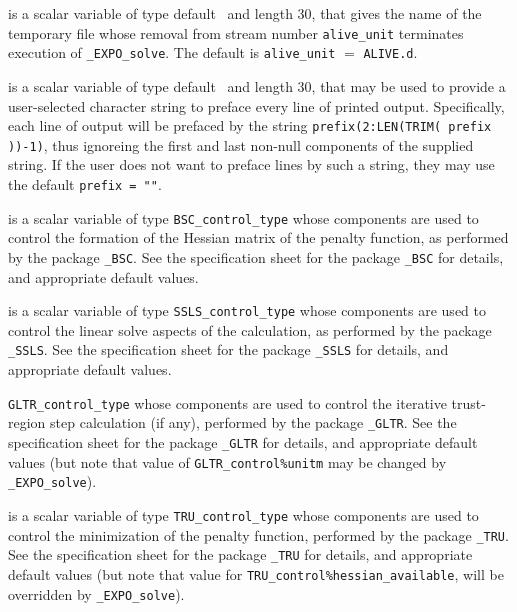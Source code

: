 \documentclass{galahad}
\newcommand{\packagename}{EXPO}
\newcommand{\fullpackagename}{\libraryname\_\packagename}
\newcommand{\solver}{{\tt \fullpackagename\_solve}}
\begin{document}
\begin{description}
 is a scalar variable of type default \character\ and length
30, that gives the name of the temporary file whose removal from stream number
{\tt alive\_unit} terminates execution of \solver.
The default is {\tt alive\_unit} $=$ {\tt ALIVE.d}.

 is a scalar variable of type default \character\
and length 30, that may be used to provide a user-selected
character string to preface every line of printed output.
Specifically, each line of output will be prefaced by the string
{\tt prefix(2:LEN(TRIM( prefix ))-1)},
thus ignoreing the first and last non-null components of the
supplied string. If the user does not want to preface lines by such
a string, they may use the default {\tt prefix = ""}.

 is a scalar variable of type
{\tt BSC\_control\_type}
whose components are used to control the formation of the Hessian matrix
of the penalty function, as performed by the package
{\tt \libraryname\_BSC}.
See the specification sheet for the package
{\tt \libraryname\_BSC}
for details, and appropriate default values.

 is a scalar variable of type
{\tt SSLS\_control\_type}
whose components are used to control the linear solve
aspects of the calculation, as performed by the package
{\tt \libraryname\_SSLS}.
See the specification sheet for the package
{\tt \libraryname\_SSLS}
for details, and appropriate default values.

{\tt GLTR\_control\_type}
whose components are used to control the
iterative trust-region step calculation (if any),
performed by the package
{\tt \libraryname\_GLTR}.
See the specification sheet for the package
{\tt \libraryname\_GLTR}
for details, and appropriate default values
(but note that value of
{\tt GLTR\_control\%unitm}
may be changed by \solver).

 is a scalar variable of type
{\tt TRU\_control\_type}
whose components are used to control the
minimization of the penalty function,
performed by the package
{\tt \libraryname\_TRU}.
See the specification sheet for the package
{\tt \libraryname\_TRU}
for details, and appropriate default values
(but note that value for
{\tt TRU\_control\%hessian\_available},
will be overridden by \solver).

\end{description}

\end{document}

